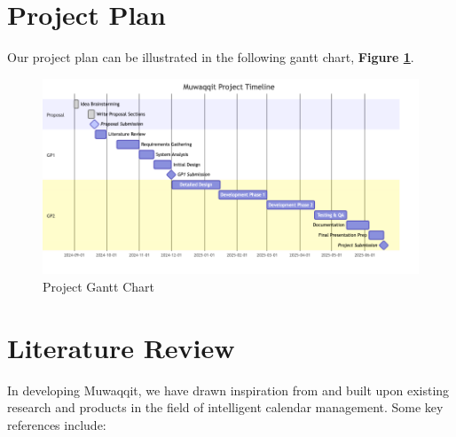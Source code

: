 \documentclass[12pt,a4paper]{article}
\begin{document}
\section{Project Plan}

Our project plan can be illustrated in the following gantt chart, \textbf{Figure \ref{fig:project-gantt-chart}}.

\begin{figure}[!h]
    \centering
    \includegraphics[width=\textwidth]{images/gantt.png}
    \caption{Project Gantt Chart}
    \label{fig:project-gantt-chart}
\end{figure}

\section{Literature Review}

In developing Muwaqqit, we have drawn inspiration from and built upon existing research and products in the field of intelligent calendar management. Some key references include:
\end{document}
